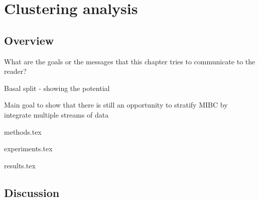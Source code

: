\section{Clustering analysis} \label{s:clustering_analysis}

\subsection{Overview}

What are the goals or the messages that this chapter tries to communicate to the reader?
\begin{todolist}
    \item Basal split - showing the potential
    \item Main goal to show that there is still an opportunity to stratify MIBC by integrate multiple streams of data
\end{todolist}

{methods.tex}

{experiments.tex}

{results.tex}

\subsection{Discussion}
